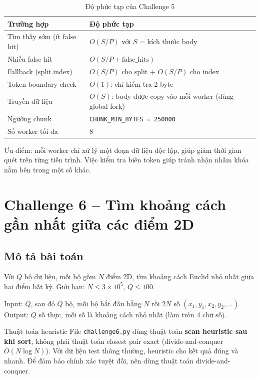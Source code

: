 \documentclass[12pt,a4paper]{article}
\begin{document}
\begin{table}[H]
\centering
\caption{Độ phức tạp của Challenge 5}
\begin{tabularx}{\textwidth}{p{4.5cm}Y}
\toprule
\textbf{Trường hợp} & \textbf{Độ phức tạp} \\
\midrule
Tìm thấy sớm (ít false hit) & $O(S/P)$ với $S$ = kích thước body \\
Nhiều false hit & $O(S/P + \text{false\_hits})$ \\
Fallback (split.index) & $O(S/P)$ cho split + $O(S/P)$ cho index \\
\midrule
\midrule
Token boundary check & $O(1)$: chỉ kiểm tra 2 byte \\
Truyền dữ liệu & $O(S)$: body được copy vào mỗi worker (dùng global fork) \\
\midrule
\midrule
Ngưỡng chunk & \texttt{CHUNK\_MIN\_BYTES = 250000} \\
Số worker tối đa & 8 \\
\bottomrule
\end{tabularx}
\end{table}

Ưu điểm: mỗi worker chỉ xử lý một đoạn dữ liệu độc lập, giúp giảm thời gian quét trên từng tiến trình. Việc kiểm tra biên token giúp tránh nhận nhầm khóa nằm bên trong một số khác.

\section{Challenge 6 -- Tìm khoảng cách gần nhất giữa các điểm 2D}

\subsection{Mô tả bài toán}

Với $Q$ bộ dữ liệu, mỗi bộ gồm $N$ điểm 2D, tìm khoảng cách Euclid nhỏ nhất giữa hai điểm bất kỳ. Giới hạn: $N \leq 3 \times 10^5$, $Q \leq 100$.

Input: $Q$, sau đó $Q$ bộ, mỗi bộ bắt đầu bằng $N$ rồi $2N$ số $(x_1, y_1, x_2, y_2, \dots)$. Output: $Q$ số thực, mỗi số là khoảng cách nhỏ nhất (làm tròn 4 chữ số).

\begin{warningbox}{Thuật toán heuristic}
File \texttt{challenge6.py} dùng thuật toán \textbf{scan heuristic sau khi sort}, không phải thuật toán closest pair exact (divide-and-conquer $O(N \log N)$). Với dữ liệu test thông thường, heuristic cho kết quả đúng và nhanh. Để đảm bảo chính xác tuyệt đối, nên dùng thuật toán divide-and-conquer.
\end{warningbox}
\end{document}
